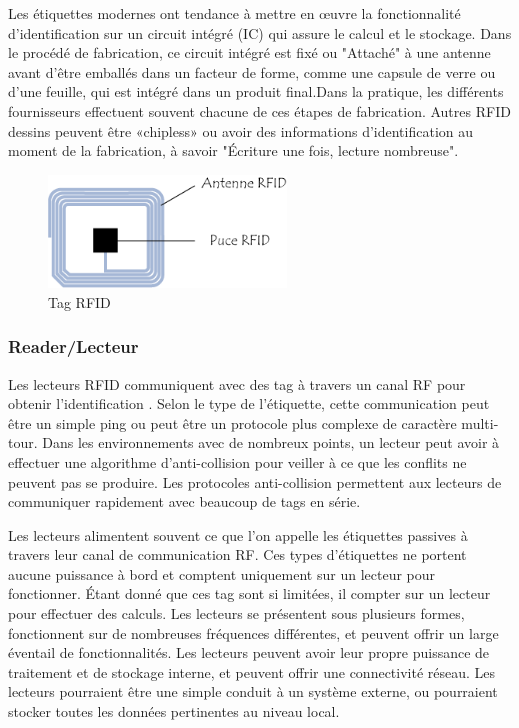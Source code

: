 \documentclass[11pt, a4paper, twoside]{book}
\begin{document}
Les étiquettes modernes ont tendance à mettre en œuvre la fonctionnalité d'identification sur un circuit intégré (IC) qui
assure le calcul et le stockage. Dans le procédé de fabrication, ce circuit intégré est fixé ou
"Attaché" à une antenne avant d'être emballés dans un facteur de forme, comme une capsule de verre ou d'une feuille, qui est intégré dans un produit final.Dans la pratique, les différents fournisseurs effectuent souvent chacune de ces étapes de fabrication. Autres RFID
dessins peuvent être «chipless» ou avoir des informations d'identification au moment de la fabrication, à savoir
"Écriture une fois, lecture nombreuse". \\
\begin{figure}[H]
\centering
\includegraphics[height=3cm]{tag}
\caption{Tag RFID}
\end{figure}
\subsubsection{Reader/Lecteur}
Les lecteurs RFID communiquent avec des tag à travers un canal RF pour obtenir l'identification
. Selon le type de l'étiquette, cette communication peut être un simple ping ou peut être un protocole plus complexe de caractère multi-tour. Dans les environnements avec de nombreux points, un lecteur peut avoir à effectuer une algorithme d'anti-collision pour veiller à ce que les conflits ne peuvent pas se produire. Les protocoles anti-collision permettent aux lecteurs de communiquer rapidement avec beaucoup de tags en série.

Les lecteurs alimentent souvent ce que l'on appelle les étiquettes passives à travers leur canal de communication RF.
Ces types d'étiquettes ne portent aucune puissance à bord et comptent uniquement sur un lecteur pour fonctionner. Étant donné que ces tag sont si limitées, il compter sur un lecteur pour effectuer des calculs.
Les lecteurs se présentent sous plusieurs formes, fonctionnent sur de nombreuses fréquences différentes, et peuvent offrir un large éventail de fonctionnalités. Les lecteurs peuvent avoir leur propre puissance de traitement et de stockage interne, et peuvent offrir une connectivité réseau. Les lecteurs pourraient être une simple conduit à un système externe, ou pourraient stocker toutes les données pertinentes au niveau local.
\end{document}
